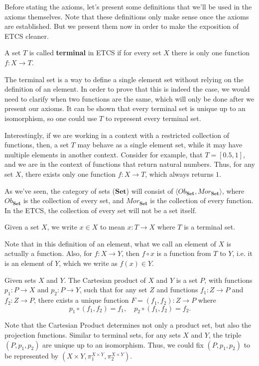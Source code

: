 Before stating the axioms, let's present some definitions that we'll be used in
the axioms themselves. Note that these definitions only make sense once the axioms
are established. But we present them now in order to make the exposition of ETCS
cleaner.

\begin{definition}
    A set $T$ is called \textbf{terminal} in ETCS if for every set $X$ there is
    only one function $f:X \to T$.
\end{definition}
The terminal set is a way to define a single element set without relying on the definition
of an element. In order to prove that this is indeed the case,
we would need to clarify when two functions are the same, which will only be done
after we present our axioms. It can be shown that every terminal set is
unique up to an isomorphism, so one could use $T$ to represent every terminal set.

Interestingly, if we are working in a context with a restricted
collection of functions, then, a set $T$ may behave as a single element set, while
it may have multiple elements in another context.
Consider for example, that $T = [0.5,1]$, and we are in the context of functions
that return natural numbers. Thus, for any set $X$, there exists only one function
$f:X \to T$, which always returns $1$.

As we've seen, the category of sets ($\bm{Set}$) will consist of $\langle Ob_{\bm{Set}}, Mor_{\bm{Set}}\rangle$,
where $Ob_{\bm{Set}}$ is the collection of every set, and $Mor_{\bm{Set}}$ is the collection of every function.
In the ETCS, the collection of every set will not be a set itself.

\begin{definition}
    Given a set $X$, we write $x \in X$ to mean $x:T \to X$ where $T$
    is a terminal set.
\end{definition}
Note that in this definition of an element, what we call an element of $X$
is actually a function. Also, for $f: X \to Y$,
then $f \circ x$ is a function from $T$ to $Y$, i.e. it is an element of $Y$,
which we write as $f(x) \in Y$.

\begin{definition}
    Given sets $X$ and $Y$. The Cartesian product of $X$ and $Y$
    is a set $P$, with functions
    $p_1 : P \to X$ and $p_2 : P \to Y$, such that for any set $Z$
    and functions $f_1 : Z \to P$ and $f_2 : Z \to P$, there exists
    a unique function $F = (f_1,f_2) : Z \to P$ where
    \begin{displaymath}
        p_1 \circ (f_1,f_2) = f_1, \quad p_2 \circ (f_1, f_2) = f_2.
    \end{displaymath}
\end{definition}
Note that the Cartesian Product determines not only a product set, but also
the projection functions. Similar to terminal sets,
for any sets $X$ and $Y$, the triple $(P,p_1,p_2)$
are unique up to an isomorphism. Thus, we could fix $(P,p_1,p_2)$ to be
represented by $(X\times Y, \pi_1^{X\times Y}, \pi_2^{X\times Y})$.

